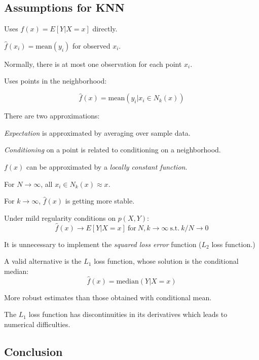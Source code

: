 \documentclass[twoside,twocolumn,10pt]{revtex4-1}
\newcommand{\SubItem}[1]{
    {\setlength\itemindent{15pt} \item[-] #1}
}
\begin{document}
	\subsection{Assumptions for KNN}
	
	\begin{itemize}
	\item Uses $f(x) = E[Y|X = x]$ directly.
	\item $\hat{f}(x_i) = \text{mean}(y_i)$ for observed $x_i$.
	\item Normally, there is at most one observation for each point $x_i$.
	\item Uses points in the neighborhood:
	
		\begin{equation*}
		\hat{f}(x) = \text{mean}(y_i | x_i \in N_k(x))
		\end{equation*}

	\item There are two approximations:
	\SubItem{\textit{Expectation} is approximated by averaging over sample data.}
	\SubItem{\textit{Conditioning} on a point is related to conditioning on a neighborhood.}
	\item $f(x)$ can be approximated by a \textit{locally constant function}.
	\item For $N \to \infty$, all $x_i \in N_k(x) \approx x$.
	\item For $k \to \infty$, $\hat{f}(x)$ is getting more stable.
	\item Under mild regularity conditions on $p(X,Y)$:
		\begin{equation*}
		\hat{f}(x) \to E[Y|X = x] \ \text{for} \ N, k \to \infty \ \text{s.t.} \ k/N \to 0
		\end{equation*}		
	\item It is unnecessary to implement the \textit{squared loss error} function ($L_2$ loss function.)
	\item A valid alternative is the $L_1$ loss function, whose solution is the conditional median:
		\begin{equation*}
		\hat{f}(x) = \text{median}(Y|X=x)
		\end{equation*}
	\item More robust estimates than those obtained with conditional mean.
	\item The $L_1$ loss function has discontinuities in its derivatives which leads to numerical difficulties.
	\end{itemize}
	
	\subsection{Conclusion}
	
\end{document}
